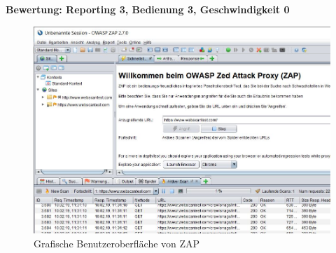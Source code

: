 \documentclass[12pt,oneside,a4paper,parskip,pointlessnumbers]{scrbook}
\begin{document}
\begin{itemize}
              \textbf{Bewertung: Reporting 3, Bedienung 3, Geschwindigkeit 0}
              \vspace{20pt}
            \begin{figure}[H]
              \centering
              \includegraphics[width=1\textwidth]{Images/ZAP}
              \caption[Grafische Benutzeroberfläche von ZAP]{Grafische Benutzeroberfläche von ZAP}
            \end{figure}

        \end{itemize}
\end{document}

